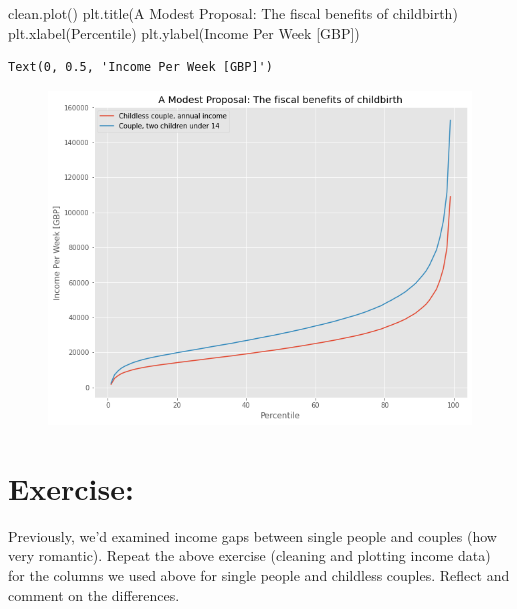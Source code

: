 \documentclass[
  letterpaper,
  DIV=11,
  numbers=noendperiod]{scrreprt}
\newenvironment{Shaded}{\begin{snugshade}}{\end{snugshade}}
\newcommand{\NormalTok}[1]{\textcolor[rgb]{0.00,0.23,0.31}{#1}}
\newcommand{\StringTok}[1]{\textcolor[rgb]{0.13,0.47,0.30}{#1}}
\begin{document}
\begin{Shaded}
\begin{Highlighting}[]
\NormalTok{clean.plot()}
\NormalTok{plt.title(}\StringTok{\textquotesingle{}A Modest Proposal: The fiscal benefits of childbirth\textquotesingle{}}\NormalTok{)}
\NormalTok{plt.xlabel(}\StringTok{\textquotesingle{}Percentile\textquotesingle{}}\NormalTok{)}
\NormalTok{plt.ylabel(}\StringTok{\textquotesingle{}Income Per Week [GBP]\textquotesingle{}}\NormalTok{)}
\end{Highlighting}
\end{Shaded}

\begin{verbatim}
Text(0, 0.5, 'Income Per Week [GBP]')
\end{verbatim}

\begin{figure}[H]

{\centering \includegraphics{notebooks/W02. Pandas_files/figure-pdf/cell-18-output-2.png}

}

\end{figure}

\hypertarget{exercise-1}{%
\section{Exercise:}\label{exercise-1}}

Previously, we'd examined income gaps between single people and couples
(how very romantic). Repeat the above exercise (cleaning and plotting
income data) for the columns we used above for single people and
childless couples. Reflect and comment on the differences.
\end{document}
